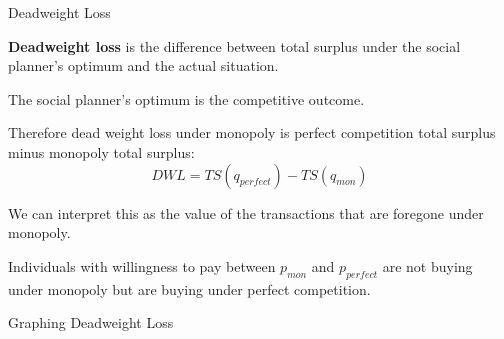 \documentclass[aspectratio=169]{beamer}
\newenvironment{wideitemize}{\itemize\addtolength{\itemsep}{10pt}}{\enditemize}
\newcommand{\vertLineFromPoint}[1]{
  \draw[dashed] 
  (#1) -- (#1|-{rel axis cs:0,0})
}
\newcommand{\horLineFromPoint}[1]{
  \draw[dashed] 
  (#1) -- (#1-|{rel axis cs:0,0})
}
\begin{document}
\begin{frame}{Deadweight Loss}
    \begin{definition}
    \textbf{Deadweight loss} is the difference between total surplus under the social planner's optimum and the actual situation.
    \end{definition}
    \begin{wideitemize}
            \item The social planner's optimum is the competitive outcome.
            \item Therefore dead weight loss under monopoly is perfect competition total surplus minus monopoly total surplus:
            \[DWL = TS(q_{perfect})-TS(q_{mon})\]
            \item We can interpret this as the value of the transactions that are foregone under monopoly.
            \item Individuals with willingness to pay between $p_{mon}$ and $p_{perfect}$ are not buying under monopoly but are buying under perfect competition.
            
    \end{wideitemize}
\end{frame}

\begin{frame}{Graphing Deadweight Loss}
\centering
\end{frame}
\end{document}
